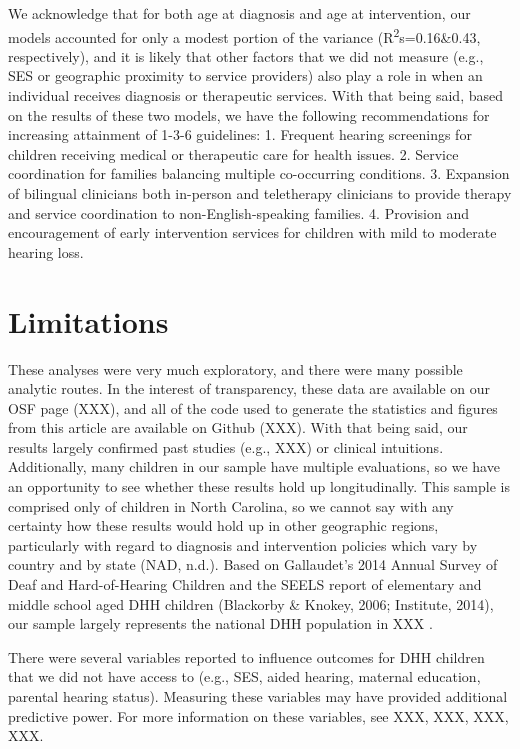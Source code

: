 \documentclass[english,man]{apa6}
\begin{document}
We acknowledge that for both age at diagnosis and age at intervention, our models accounted for only a modest portion of the variance (R\textsuperscript{2}s=0.16\&0.43, respectively), and it is likely that other factors that we did not measure (e.g., SES or geographic proximity to service providers) also play a role in when an individual receives diagnosis or therapeutic services. With that being said, based on the results of these two models, we have the following recommendations for increasing attainment of 1-3-6 guidelines:
1. Frequent hearing screenings for children receiving medical or therapeutic care for health issues.
2. Service coordination for families balancing multiple co-occurring conditions.
3. Expansion of bilingual clinicians both in-person and teletherapy clinicians to provide therapy and service coordination to non-English-speaking families.
4. Provision and encouragement of early intervention services for children with mild to moderate hearing loss.

\hypertarget{limitations}{%
\section{Limitations}\label{limitations}}

These analyses were very much exploratory, and there were many possible analytic routes. In the interest of transparency, these data are available on our OSF page (XXX), and all of the code used to generate the statistics and figures from this article are available on Github (XXX). With that being said, our results largely confirmed past studies (e.g., XXX) or clinical intuitions. Additionally, many children in our sample have multiple evaluations, so we have an opportunity to see whether these results hold up longitudinally.
This sample is comprised only of children in North Carolina, so we cannot say with any certainty how these results would hold up in other geographic regions, particularly with regard to diagnosis and intervention policies which vary by country and by state (NAD, n.d.). Based on Gallaudet's 2014 Annual Survey of Deaf and Hard-of-Hearing Children and the SEELS report of elementary and middle school aged DHH children (Blackorby \& Knokey, 2006; Institute, 2014), our sample largely represents the national DHH population in XXX .

There were several variables reported to influence outcomes for DHH children that we did not have access to (e.g., SES, aided hearing, maternal education, parental hearing status). Measuring these variables may have provided additional predictive power. For more information on these variables, see XXX, XXX, XXX, XXX.
\end{document}
